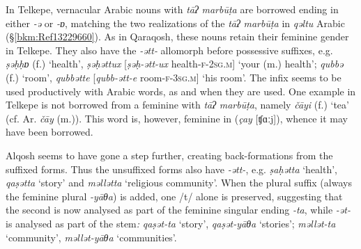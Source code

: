 \documentclass[output=paper]{langsci/langscibook}
\begin{document}
In  Telkepe, vernacular Arabic nouns with \textit{tāʔ} \textit{marbūṭa} are borrowed ending in either \textit{\nobreakdash-ə} or \textit{\nobreakdash-ɒ}, matching the two realizations of the \textit{tāʔ} \textit{marbūṭa} in \textit{qəltu} Arabic (§\ref{bkm:Ref13229660}). As in Qaraqosh, these nouns retain their feminine {gender} in Telkepe. They also have the \textit{\nobreakdash-ətt-} allomorph before possessive suffixes, e.g. \textit{ṣəḥḥɒ} (f.) ‘health’,  \textit{ṣəḥəttux} [\textit{ṣəḥ-ətt-ux} health-\textsc{f-2sg.m}] ‘your (m.) health’; \textit{qubbə} (f.) ‘room’, \textit{qubbətte} [\textit{qubb-ətt-e} room-\textsc{f-3sg.m}] ‘his room’. The infix seems to be used productively with Arabic words, as and when they are used. One example in Telkepe is not borrowed from a feminine with \textit{tāʔ} \textit{marbūṭa}, namely \textit{čāyi} (f.) ‘tea’ (cf.  Ar. \textit{čāy} (m.)). This word is, however, feminine in  (\textit{çay} [ʧɑːj]), whence it may have been borrowed.

 Alqosh seems to have gone a step further, creating {back-formations} from the suffixed forms. Thus the unsuffixed forms also have \textit{{}-ətt-}, e.g. \textit{ṣaḥətta} ‘health’, \textit{qaṣətta} ‘story’ and \textit{məllətta} ‘religious community’. When the plural suffix (always the feminine plural \textit{\nobreakdash-yāθa}) is added, one /t/ alone is preserved, suggesting that the second is now analysed as part of the feminine singular ending \textit{\nobreakdash-ta}, while \textit{\nobreakdash-ət\nobreakdash-} is analysed as part of the {stem}\textit{:} \textit{qaṣət\nobreakdash-ta} ‘story’, \textit{qaṣət\nobreakdash-yāθa} ‘stories’; \textit{məllət\nobreakdash-ta} ‘community’, \textit{məllət\nobreakdash-yāθa} ‘communities’.
\end{document}
